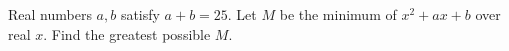 Real numbers $a,b$ satisfy $a+b=25$. Let $M$ be the minimum of $x^2+ax+b$ over real $x$. Find the greatest possible $M$.
